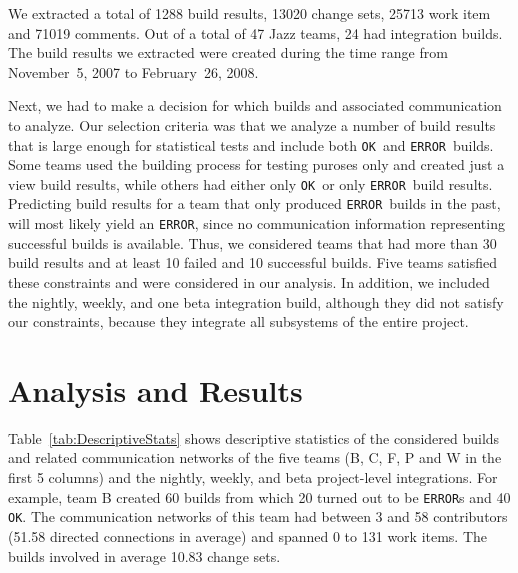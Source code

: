 \documentclass[12pt,oneside]{book}
\newcommand\error{\texttt{ERROR}}
\newcommand\ok{\texttt{OK}}
\begin{document}
We extracted a total of 1288 build results, 13020 change sets, 25713 work item
and 71019 comments. Out of a total of 47 Jazz teams, 24 had integration builds.
The build results we extracted were created during the time range from
November~5, 2007 to February~26, 2008.

Next, we had to make a decision for which builds and associated communication to
analyze. Our selection criteria was that we analyze a number of build results
that is large enough for statistical tests and include both \ok\ and \error\
builds. Some teams used the building process for testing puroses only and created
just a view build results, while others had either only \ok\ or only \error\
build results. Predicting build results for a team that only produced \error\
builds in the past, will most likely yield an \error, since no communication
information representing successful builds is available. Thus, we considered
teams that had more than 30 build results and at least 10 failed and 10
successful builds. Five teams satisfied these constraints and were considered in
our analysis. In addition, we included the nightly, weekly, and one beta
integration build, although they did not satisfy our constraints, because 
they integrate all subsystems of the entire project.






\section{Analysis and Results}
\label{sec:AnalysisResults}
Table~\ref{tab:DescriptiveStats} shows descriptive statistics of the considered
builds and related communication networks of the five teams (B, C, F, P and W in
the first 5 columns) and the nightly, weekly, and beta project-level
integrations. For example, team B created 60 builds from which 20 turned out to
be \error s and 40 \ok. The communication networks of this team had between 3 and
58 contributors (51.58 directed connections in average) and spanned 0 to 131 work
items. The builds involved in average 10.83 change sets.
\end{document}
